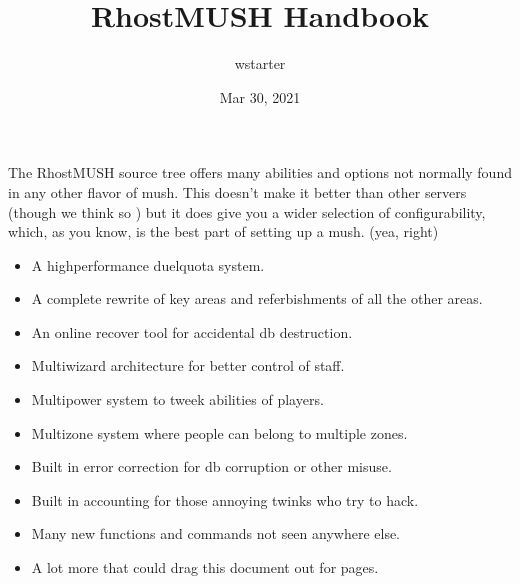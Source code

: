 \documentclass[letterpaper,10pt,english]{sphinxmanual}
\title{RhostMUSH Handbook}
\date{Mar 30, 2021}
\author{wstarter}
\begin{document}
\pagestyle{empty}
\sphinxmaketitle
\pagestyle{plain}
\sphinxtableofcontents
\pagestyle{normal}
\label{\detokenize{index::doc}}


\sphinxAtStartPar
The RhostMUSH source tree offers many abilities and options
not normally found in any other flavor of mush.  This doesn’t
make it better than other servers (though we think so )
but it does give you a wider selection of configurability,
which, as you know, is the best part of setting up a mush.
(yea, right)
\begin{itemize}
\item {} 
\sphinxAtStartPar
A high\sphinxhyphen{}performance duel\sphinxhyphen{}quota system.

\item {} 
\sphinxAtStartPar
A complete rewrite of key areas and referbishments of all the other areas.

\item {} 
\sphinxAtStartPar
An on\sphinxhyphen{}line recover tool for accidental db destruction.

\item {} 
\sphinxAtStartPar
Multi\sphinxhyphen{}wizard architecture for better control of staff.

\item {} 
\sphinxAtStartPar
Multi\sphinxhyphen{}power system to tweek abilities of players.

\item {} 
\sphinxAtStartPar
Multi\sphinxhyphen{}zone system where people can belong to multiple zones.

\item {} 
\sphinxAtStartPar
Built in error correction for db corruption or other misuse.

\item {} 
\sphinxAtStartPar
Built in accounting for those annoying twinks who try to hack.

\item {} 
\sphinxAtStartPar
Many new functions and commands not seen anywhere else.

\item {} 
\sphinxAtStartPar
A lot more that could drag this document out for pages.

\end{itemize}
\end{document}
